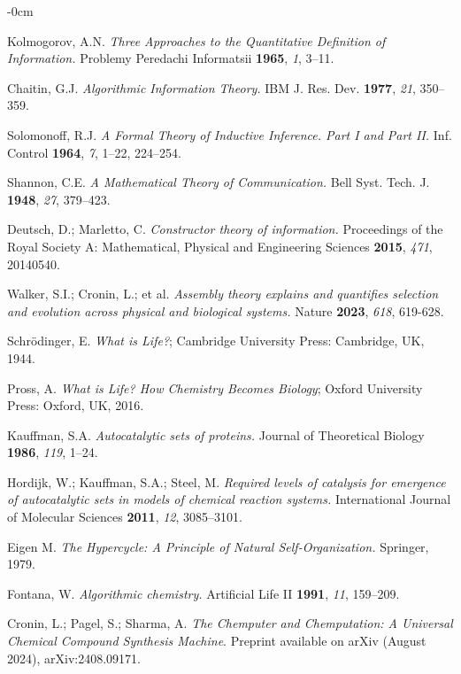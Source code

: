 \documentclass[life,article,submit,pdftex,moreauthors]{Definitions/mdpi}
\begin{document}
\begin{adjustwidth}{-\extralength}{0cm}
{\begin{thebibliography}{999}
Kolmogorov, A.N. \textit{Three Approaches to the Quantitative Definition of Information.} Problemy Peredachi Informatsii \textbf{1965}, \textit{1}, 3–11.

Chaitin, G.J. \textit{Algorithmic Information Theory.} IBM J. Res. Dev. \textbf{1977}, \textit{21}, 350–359.

Solomonoff, R.J. \textit{A Formal Theory of Inductive Inference. Part I and Part II.} Inf. Control \textbf{1964}, \textit{7}, 1–22, 224–254.

Shannon, C.E. \textit{A Mathematical Theory of Communication.} Bell Syst. Tech. J. \textbf{1948}, \textit{27}, 379–423.

Deutsch, D.; Marletto, C. \textit{Constructor theory of information.} Proceedings of the Royal Society A: Mathematical, Physical and Engineering Sciences \textbf{2015}, \textit{471}, 20140540.

Walker, S.I.; Cronin, L.; et al. \textit{Assembly theory explains and quantifies selection and evolution across physical and biological systems.} Nature \textbf{2023}, \textit{618}, 619-628.

Schrödinger, E. \textit{What is Life?}; Cambridge University Press: Cambridge, UK, 1944.

Pross, A. \textit{What is Life? How Chemistry Becomes Biology}; Oxford University Press: Oxford, UK, 2016.

Kauffman, S.A. \textit{Autocatalytic sets of proteins.} Journal of Theoretical Biology \textbf{1986}, \textit{119}, 1–24.

Hordijk, W.; Kauffman, S.A.; Steel, M. \textit{Required levels of catalysis for emergence of autocatalytic sets in models of chemical reaction systems.} International Journal of Molecular Sciences \textbf{2011}, \textit{12}, 3085–3101.

Eigen M. \textit{The Hypercycle: A Principle of Natural Self-Organization.} Springer, 1979.

Fontana, W. \textit{Algorithmic chemistry.} Artificial Life II \textbf{1991}, \textit{11}, 159–209.

Cronin, L.; Pagel, S.; Sharma, A. \textit{The Chemputer and Chemputation: A Universal Chemical Compound Synthesis Machine}. Preprint available on arXiv (August 2024), arXiv:2408.09171.


\end{thebibliography}}
\end{adjustwidth}
\end{document}
